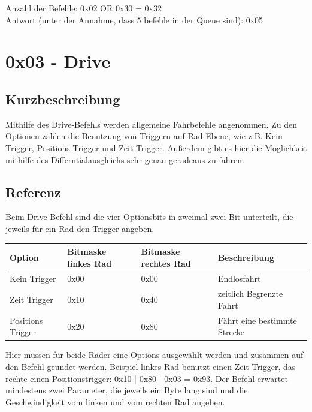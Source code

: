 \documentclass[a4paper]{article}
\begin{document}
	Anzahl der Befehle: 0x02 OR 0x30 = 0x32\\
	Antwort (unter der Annahme, dass 5 befehle in der Queue sind): 0x05
	\pagebreak


	\section{0x03 - Drive}

	\subsection{Kurzbeschreibung}

	Mithilfe des Drive-Befehls werden allgemeine Fahrbefehle angenommen. Zu den Optionen zählen die Benutzung von Triggern
	auf Rad-Ebene, wie z.B. Kein Trigger, Positions-Trigger und Zeit-Trigger. Außerdem gibt es hier die Möglichkeit
	mithilfe des Differntialausgleichs sehr genau geradeaus zu fahren.

	\subsection{Referenz}

	Beim Drive Befehl sind die vier Optionsbits in zweimal zwei Bit unterteilt, die jeweils für ein Rad den Trigger angeben.

	\begin{tabularx}{\linewidth}{|l|l|l|X|}
		\hline
		\textbf{Option} & \textbf{Bitmaske linkes Rad} & \textbf{Bitmaske rechtes Rad} & \textbf{Beschreibung} \\
		\hline
		\hline
		Kein Trigger	& 0x00						   & 0x00						   & Endlosfahrt \\
		\hline
		Zeit Trigger	& 0x10						   & 0x40						   & zeitlich Begrenzte Fahrt\\
		\hline
		Positions Trigger & 0x20					   & 0x80						   & Fährt eine bestimmte Strecke \\
		\hline
	\end{tabularx}
	
	Hier müssen für beide Räder eine Options ausgewählt werden und zusammen auf den Befehl geundet werden. Beispiel linkes
	Rad benutzt einen Zeit Trigger, das rechte einen Positionstrigger: 0x10 | 0x80 | 0x03 = 0x93.
	Der Befehl erwartet mindestens zwei Parameter, die jeweils ein Byte lang sind und die Geschwindigkeit vom linken und
	vom rechten Rad angeben.
\end{document}
